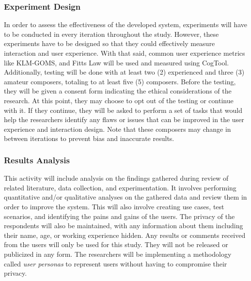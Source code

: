 \subsubsection{Experiment Design}
 In order to assess the effectiveness of the developed system, experiments will have to be conducted in every iteration throughout the study. However, these experiments have to be designed so that they could effectively measure interaction and user experience. With that said, common user experience metrics like KLM-GOMS, and Fitts Law will be used and measured using CogTool. Additionally, testing will be done with at least two (2) experienced and three (3) amateur composers, totaling to at least five (5) composers. Before the testing, they will be given a consent form indicating the ethical considerations of the research. At this point, they may choose to opt out of the testing or continue with it. If they continue, they will be asked to perform a set of tasks that would help the researchers identify any flaws or issues that can be improved in the user experience and interaction design. Note that these composers may change in between iterations to prevent bias and inaccurate results. 


\subsubsection{Results Analysis}
This activity will include analysis on the findings gathered during review of related literature, data collection, and experimentation. It involves performing quantitative and/or qualitative analyses on the gathered data and review them in order to improve the system. This will also involve creating use cases, test scenarios, and identifying the pains and gains of the users. The privacy of the respondents will also be maintained, with any information about them including their name, age, or working experience hidden. Any results or comments received from the users will only be used for this study. They will not be released or publicized in any form. The researchers will be implementing a methodology called \textit{user personas} to represent users without having to compromise their privacy.


